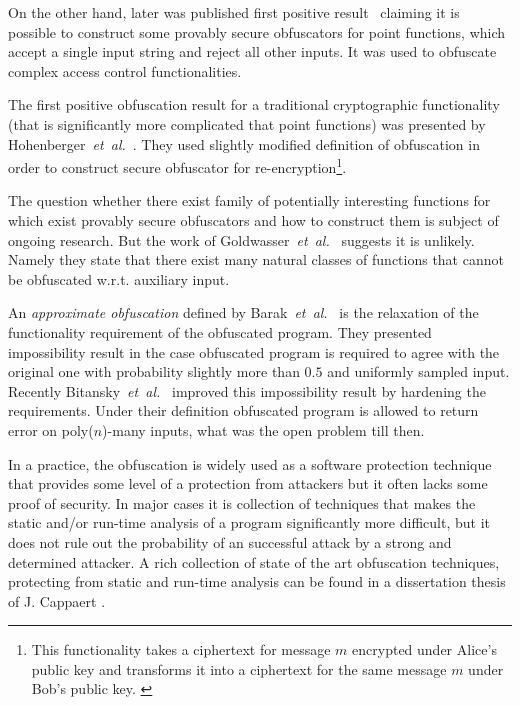 \documentclass[11pt,oneside,final]{fithesis2}
\newcommand{\eal}{\emph{et~al.}}
\begin{document}
    On the other hand,
    later was published first positive result~\citep{Lynn04positiveresults} claiming it is possible to construct some provably 
    secure obfuscators for point functions, which accept a single input string and reject all other inputs. 
    It was used to obfuscate complex access control functionalities.
    
    The first positive obfuscation result for a traditional cryptographic functionality (that is significantly more complicated that point functions)
    was presented by Hohenberger~\eal~\citep{Hohenberger:2007:SOR:1760749.1760767}.
    They used slightly modified definition of obfuscation in order to construct secure obfuscator for 
    re-encryption\footnote{This functionality takes a ciphertext for message $m$ encrypted under Alice’s public key and transforms it into a 
    ciphertext for the same message $m$ under Bob’s public key. \citep{Hohenberger:2007:SOR:1760749.1760767}}.

    The question whether there exist family of potentially interesting functions for which exist provably secure obfuscators and how to construct them
    is subject of ongoing research. But the work of Goldwasser~\eal~\citep{Goldwasser:2005:IOA:1097112.1097490} suggests it is unlikely. 
    Namely they state that there exist many natural classes of functions that cannot be obfuscated w.r.t. auxiliary input.

    An \emph{approximate obfuscation} defined by Barak~\eal~\citep{Barak:2012:POP:2160158.2160159} is the relaxation of the functionality
    requirement of the obfuscated program. They presented impossibility result in the case obfuscated program is required to agree with the original one
    with probability slightly more than $0.5$ and uniformly sampled input. Recently Bitansky~\eal~\citep{journals/iacr/BitanskyP12} improved
    this impossibility result by hardening the requirements. Under their definition obfuscated program is allowed to return error on poly($n$)-many inputs,
    what was the open problem till then.
    
    In a practice, the obfuscation is widely used as a software protection technique that provides some level of a protection from attackers but 
    it often lacks some proof of security. In major cases it is collection of techniques that makes the static and/or run-time analysis of a program
    significantly more difficult, but it does not rule out the probability of an successful attack by a strong and determined attacker. 
    A rich collection of state of the art obfuscation techniques, protecting from static and run-time analysis can be found in a dissertation thesis
    of J. Cappaert \citep{codeObfuscation}. 
    
\end{document}
